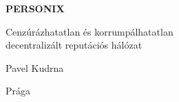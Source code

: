\thispagestyle{empty}
\begin{center}
  {\sffamily\bfseries\fontsize{34}{40}\selectfont PERSONIX\par}
  \vspace{2.2em}
  {\rmfamily\large Cenzúrázhatatlan és korrumpálhatatlan\\[0.25em]
   decentralizált reputációs hálózat\par}
\end{center}
\begin{center}
  {\rmfamily\Large Pavel Kudrna\par}
  \vspace{0.45em}
  {\rmfamily\small Prága\quad\textbullet{}\par}
\end{center}
\clearpage
